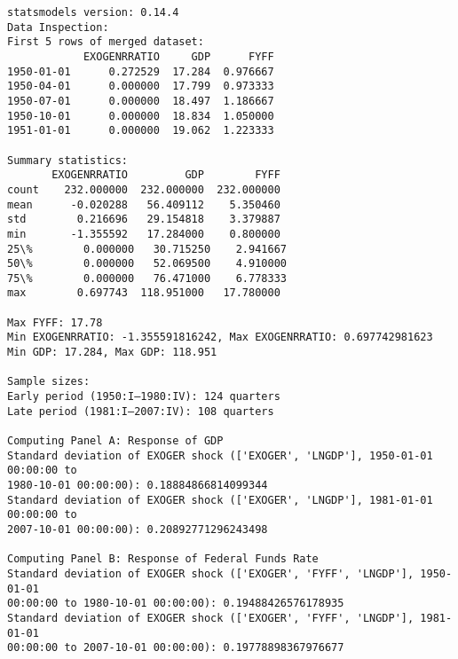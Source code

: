 \documentclass[11pt]{article}
\begin{document}
    \begin{Verbatim}[commandchars=\\\{\}]
statsmodels version: 0.14.4
Data Inspection:
First 5 rows of merged dataset:
            EXOGENRRATIO     GDP      FYFF
1950-01-01      0.272529  17.284  0.976667
1950-04-01      0.000000  17.799  0.973333
1950-07-01      0.000000  18.497  1.186667
1950-10-01      0.000000  18.834  1.050000
1951-01-01      0.000000  19.062  1.223333

Summary statistics:
       EXOGENRRATIO         GDP        FYFF
count    232.000000  232.000000  232.000000
mean      -0.020288   56.409112    5.350460
std        0.216696   29.154818    3.379887
min       -1.355592   17.284000    0.800000
25\%        0.000000   30.715250    2.941667
50\%        0.000000   52.069500    4.910000
75\%        0.000000   76.471000    6.778333
max        0.697743  118.951000   17.780000

Max FYFF: 17.78
Min EXOGENRRATIO: -1.355591816242, Max EXOGENRRATIO: 0.697742981623
Min GDP: 17.284, Max GDP: 118.951

Sample sizes:
Early period (1950:I–1980:IV): 124 quarters
Late period (1981:I–2007:IV): 108 quarters

Computing Panel A: Response of GDP
Standard deviation of EXOGER shock (['EXOGER', 'LNGDP'], 1950-01-01 00:00:00 to
1980-10-01 00:00:00): 0.18884866814099344
Standard deviation of EXOGER shock (['EXOGER', 'LNGDP'], 1981-01-01 00:00:00 to
2007-10-01 00:00:00): 0.20892771296243498

Computing Panel B: Response of Federal Funds Rate
Standard deviation of EXOGER shock (['EXOGER', 'FYFF', 'LNGDP'], 1950-01-01
00:00:00 to 1980-10-01 00:00:00): 0.19488426576178935
Standard deviation of EXOGER shock (['EXOGER', 'FYFF', 'LNGDP'], 1981-01-01
00:00:00 to 2007-10-01 00:00:00): 0.19778898367976677
    \end{Verbatim}

    \begin{center}
    \end{center}
    { \hspace*{\fill} \\}
    
\end{document}

